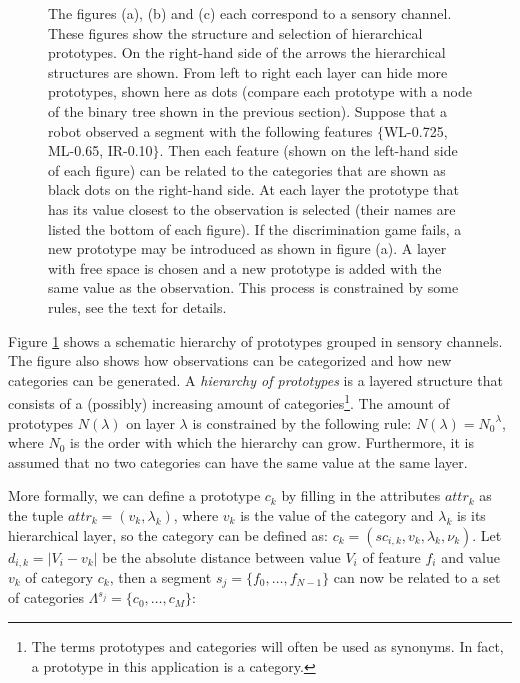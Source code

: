 \begin{figure}
\centering
{}
\caption{The figures (a), (b) and (c) each correspond to a sensory channel. These figures show the structure and selection of hierarchical prototypes. On the right-hand side of the arrows the hierarchical structures are shown. From left to right each layer can hide more prototypes, shown here as dots (compare each prototype with a node of the binary tree shown in the previous section).
Suppose that a robot observed a segment with the following features $\{$WL-0.725, ML-0.65, IR-0.10$\}$. Then each feature (shown on the left-hand side of each figure) can be related to the categories that are shown as black dots on the right-hand side. At each layer the prototype that has its value closest to the observation is selected (their names are listed the bottom of each figure). If the discrimination game fails, a new prototype may be introduced as shown in figure (a). A layer with free space is chosen and a new prototype is added with the same value as the observation. This process is constrained by some rules, see the text for details.}
\label{f:cm:prototree}
\end{figure}

Figure \ref{f:cm:prototree} shows a schematic hierarchy of prototypes grouped in sensory channels. The figure also shows how observations can be categorized and how new categories can be generated. A {\em hierarchy of prototypes} is a layered structure that consists of a (possibly) increasing amount of categories\footnote{The terms prototypes and categories will often be used as synonyms. In fact, a prototype in this application is a category.}. The amount of prototypes $N(\lambda)$ on layer $\lambda$ is constrained by the following rule: $N(\lambda)={N_0}^\lambda$, where $N_0$ is the order with which the hierarchy can grow. Furthermore, it is assumed that no two categories can have the same value at the same layer.

\p
{}
More formally, we can define a prototype $c_k$ by filling in the attributes $attr_k$ as the tuple $attr_k = (v_k, \lambda_k)$, where $v_k$ is the value of the category and $\lambda_k$ is its hierarchical layer, so the category can be defined as: $c_k = (sc_{i,k}, v_k, \lambda_k, \nu_k)$. Let $d_{i,k}=|V_i-v_k|$ be the absolute distance between value $V_i$ of feature $f_i$ and value $v_k$ of category $c_k$, then a segment $s_j=\{f_0,\ldots,f_{N-1}\}$ can now be related to a set of categories $\Lambda^{s_j}=\{c_0,\ldots,c_M\}$:

